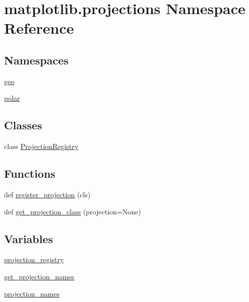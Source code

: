 \hypertarget{namespacematplotlib_1_1projections}{}\section{matplotlib.\+projections Namespace Reference}
\label{namespacematplotlib_1_1projections}
\subsection*{Namespaces}
\begin{DoxyCompactItemize}
\item 
 \hyperlink{namespacematplotlib_1_1projections_1_1geo}{geo}
\item 
 \hyperlink{namespacematplotlib_1_1projections_1_1polar}{polar}
\end{DoxyCompactItemize}
\subsection*{Classes}
\begin{DoxyCompactItemize}
\item 
class \hyperlink{classmatplotlib_1_1projections_1_1ProjectionRegistry}{Projection\+Registry}
\end{DoxyCompactItemize}
\subsection*{Functions}
\begin{DoxyCompactItemize}
\item 
def \hyperlink{namespacematplotlib_1_1projections_a3d947058fa77a3cfce8e43440c1b02b6}{register\+\_\+projection} (cls)
\item 
def \hyperlink{namespacematplotlib_1_1projections_a29c83d598d48d870d24adc888d315dbf}{get\+\_\+projection\+\_\+class} (projection=None)
\end{DoxyCompactItemize}
\subsection*{Variables}
\begin{DoxyCompactItemize}
\item 
\hyperlink{namespacematplotlib_1_1projections_ad9868ec27ca822aab6a06395cb398d0f}{projection\+\_\+registry}
\item 
\hyperlink{namespacematplotlib_1_1projections_ab0d55b51a11561767d30efbf54c39daf}{get\+\_\+projection\+\_\+names}
\item 
\hyperlink{namespacematplotlib_1_1projections_a2a31c3c7e1a982837fc5552fd13c5763}{projection\+\_\+names}
\end{DoxyCompactItemize}


